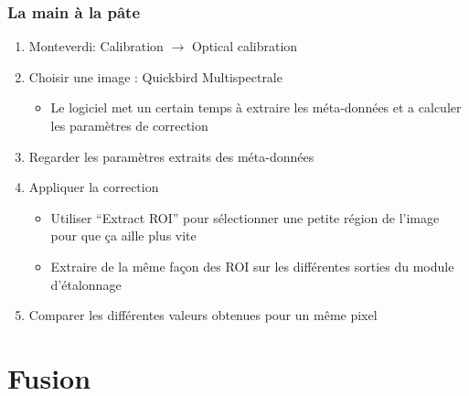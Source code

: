 \documentclass[compress]{beamer}
\begin{document}
\begin{frame}
\frametitle{La main à la pâte}
\begin{enumerate}
\item Monteverdi: Calibration $\rightarrow$ Optical calibration
\item Choisir une image : Quickbird Multispectrale
  \begin{itemize}
  \item Le logiciel met un certain temps à extraire les méta-données
    et a calculer les paramètres de correction
  \end{itemize}
\item Regarder les paramètres extraits des méta-données
\item Appliquer la correction
  \begin{itemize}
  \item Utiliser ``Extract ROI'' pour sélectionner une petite région de
    l'image pour que ça aille plus vite
  \item Extraire de la même façon des ROI sur les différentes sorties
    du module d'étalonnage
  \end{itemize}
\item Comparer les différentes valeurs obtenues pour un même pixel
\end{enumerate}
\end{frame}

\section{Fusion}
\end{document}
